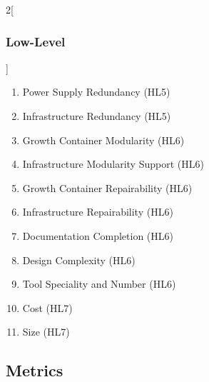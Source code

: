 \documentclass{report}
\begin{document}
\begin{multicols}{2}[\subsubsection{Low-Level}\label{sec:llos}]
\begin{enumerate}
        \item Power Supply Redundancy \hfill (HL5)
        \item Infrastructure Redundancy \hfill (HL5)
        \item Growth Container Modularity \hfill (HL6)
        \item Infrastructure Modularity Support \hfill (HL6)
        \item Growth Container Repairability \hfill (HL6)
        \item Infrastructure Repairability \hfill (HL6)
        \item Documentation Completion \hfill (HL6)
        \item Design Complexity \hfill (HL6)
        \item Tool Speciality and Number \hfill (HL6)
        \item Cost \hfill (HL7)
        \item Size \hfill (HL7)
    \end{enumerate}
\end{multicols}

\newpage

\subsection{Metrics}
\label{sec:metrics}
\end{document}
